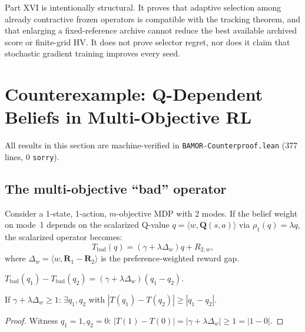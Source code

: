 \begin{remark}
Part XVI is intentionally structural.  It proves that adaptive selection among already contractive frozen operators is compatible with the tracking theorem, and that enlarging a fixed-reference archive cannot reduce the best available archived score or finite-grid HV.  It does not prove selector regret, nor does it claim that stochastic gradient training improves every seed.
\end{remark}


\section{Counterexample: Q-Dependent Beliefs in Multi-Objective RL}
\label{app:counterexample}

All results in this section are machine-verified in \texttt{BAMOR-Counterproof.lean} (377 lines, 0 \texttt{sorry}).

\subsection{The multi-objective ``bad'' operator}

Consider a 1-state, 1-action, $m$-objective MDP with 2 modes.  If the belief weight on mode~1 depends on the scalarized Q-value $q = \langle w, \mathbf{Q}(s,a) \rangle$ via $\rho_1(q) = \lambda q$, the scalarized operator becomes:
\begin{equation}
    T_{\mathrm{bad}}(q) = (\gamma + \lambda\Delta_w) q + R_{2,w},
\end{equation}
where $\Delta_w = \langle w, \mathbf{R}_1 - \mathbf{R}_2 \rangle$ is the preference-weighted reward gap.

\begin{lemma}
$T_{\mathrm{bad}}(q_1) - T_{\mathrm{bad}}(q_2) = (\gamma + \lambda\Delta_w)(q_1 - q_2)$.
\end{lemma}

\begin{theorem}
If $\gamma + \lambda\Delta_w \ge 1$: $\exists q_1, q_2$ with $|T(q_1) - T(q_2)| \ge |q_1 - q_2|$.
\end{theorem}
\begin{proof}
Witness $q_1 = 1, q_2 = 0$: $|T(1) - T(0)| = |\gamma + \lambda\Delta_w| \ge 1 = |1 - 0|$.
\end{proof}

